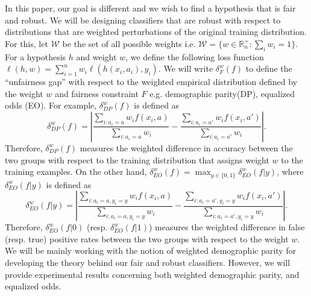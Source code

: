 \documentclass{article}
\newcommand{\set}[1]{\{#1\}}
\newcommand{\bbR}{\mathbb{R}}
\newcommand{\WW}{\mathcal{W}}
\newcommand{\abs}[1]{\left|#1\right|}
\begin{document}
In this paper, our goal is different and we wish to find a hypothesis that is fair and robust. We will be designing classifiers that are robust with respect to distributions that are weighted perturbations of the original training distribution. For this, let
 $\WW$ be the set of all possible weights i.e. $\WW = \set{w \in \bbR^+_n : \sum_i w_i = 1}$. For a hypothesis $h$ and weight $w$, we define the following loss function $\ell(h,w) = \sum_{i=1}^n w_i \ell(h(x_i,a_i), y_i)$. We will write  $\delta_F^w(f)$ to define the ``unfairness gap'' with respect to the weighted empirical distribution defined by the weight $w$ and fairness constraint $F$ e.g. demographic parity(DP), equalized odds (EO). For example, $\delta^w_{DP}(f)$ is defined as
\begin{equation}\label{eq:delta-w-dp}
\delta^w_{DP}(f) = \abs{ \frac{\sum_{i: a_i = a} w_i f(x_i,a)}{\sum_{i: a_i = a} w_i} -  \frac{\sum_{i: a_i = a'} w_i f(x_i,a')}{{\sum_{i: a_i = a'} w_i}} }.
\end{equation}
Therefore, $\delta^w_{DP}(f)$ measures the weighted difference in accuracy between the two groups with respect to the training distribution that assigns weight $w$ to the training examples.
On the other hand, $\delta^w_{EO}(f) = \max_{y \in \set{0,1}} \delta^w_{EO}(f|y)$, where $\delta^w_{EO}(f|y)$ is defined as
$$\delta^w_{EO}(f|y) = \abs{ \frac{\sum_{i: a_i = a,y_i = y} w_i f(x_i,a)}{\sum_{i: a_i = a,y_i = y} w_i} -  \frac{\sum_{i: a_i = a',y_i=y} w_i f(x_i,a')}{{\sum_{i: a_i = a',y_i=y} w_i}} }.$$
Therefore, $\delta^w_{EO}(f|0)$ (resp. $\delta^w_{EO}(f|1)$) measures the weighted difference in false (resp. true) positive rates between the two groups with respect to the weight $w$.
%
We will be mainly working with the notion of weighted demographic parity for developing the theory behind our fair and robust classifiers. However, we will provide experimental results concerning both weighted demographic parity, and equalized odds.
\end{document}
